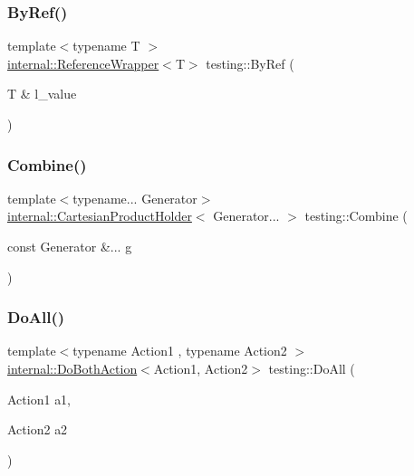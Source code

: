 \subsubsection{\texorpdfstring{ByRef()}{ByRef()}\hspace{0.1cm}{\footnotesize\ttfamily [2/2]}}
{\footnotesize\ttfamily template$<$typename T $>$ \\
\mbox{\hyperlink{classtesting_1_1internal_1_1_reference_wrapper}{internal\+::\+Reference\+Wrapper}}$<$T$>$ testing\+::\+By\+Ref (\begin{DoxyParamCaption}\item[{T \&}]{l\+\_\+value }\end{DoxyParamCaption})\hspace{0.3cm}{\ttfamily [inline]}}

\mbox{\label{namespacetesting_aa79138ff6a7f479fea4fed96a677f083}} 
\subsubsection{\texorpdfstring{Combine()}{Combine()}}
{\footnotesize\ttfamily template$<$typename... Generator$>$ \\
\mbox{\hyperlink{classtesting_1_1internal_1_1_cartesian_product_holder}{internal\+::\+Cartesian\+Product\+Holder}}$<$ Generator... $>$ testing\+::\+Combine (\begin{DoxyParamCaption}\item[{const Generator \&...}]{g }\end{DoxyParamCaption})}

\mbox{\label{namespacetesting_a5f533932753d2af95000e96c4a3042e3}} 
\subsubsection{\texorpdfstring{DoAll()}{DoAll()}\hspace{0.1cm}{\footnotesize\ttfamily [1/10]}}
{\footnotesize\ttfamily template$<$typename Action1 , typename Action2 $>$ \\
\mbox{\hyperlink{classtesting_1_1internal_1_1_do_both_action}{internal\+::\+Do\+Both\+Action}}$<$Action1, Action2$>$ testing\+::\+Do\+All (\begin{DoxyParamCaption}\item[{Action1}]{a1,  }\item[{Action2}]{a2 }\end{DoxyParamCaption})\hspace{0.3cm}{\ttfamily [inline]}}

